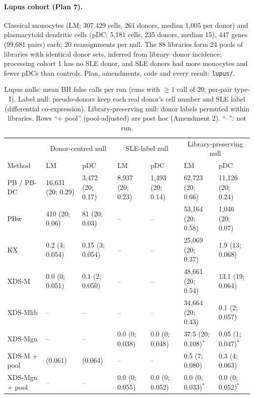 \paragraph{Lupus cohort (Plan 7).} Classical monocytes (LM; 307{,}429 cells, 261 donors, median 1{,}005 per donor) and plasmacytoid dendritic cells (pDC; 5{,}181 cells, 235 donors, median 15), 447 genes (99{,}681 pairs) each; 20 reassignments per null. The 88 libraries form 24 pools of libraries with identical donor sets, inferred from library--donor incidence; processing cohort 1 has no SLE donor, and SLE donors had more monocytes and fewer pDCs than controls. Plan, amendments, code and every result: \texttt{lupus/}.
\begin{table}[h]\centering\footnotesize\setlength{\tabcolsep}{3pt}
\caption{Lupus nulls: mean BH false calls per run (runs with $\ge1$ call of 20; per-pair type-I). Label null: pseudo-donors keep each real donor's cell number and SLE label (differential co-expression). Library-preserving null: donor labels permuted within libraries. Rows ``+ pool'' (pool-adjusted) are post hoc (Amendment 2). ``--'': not run.}\label{tab:lupus}
\begin{tabular}{@{}lllllll@{}}\toprule
 & \multicolumn{2}{c}{Donor-centred null} & \multicolumn{2}{c}{SLE-label null} & \multicolumn{2}{c}{Library-preserving null}\\
Method & LM & pDC & LM & pDC & LM & pDC\\\midrule
PB / PB-DC & 16{,}631 (20; 0.29) & 3{,}472 (20; 0.17) & 8{,}937 (20; 0.23) & 1{,}493 (20; 0.14) & 62{,}723 (20; 0.66) & 11{,}126 (20; 0.24)\\
PBw & 410 (20; 0.06) & 81 (20; 0.03) & -- & -- & 53{,}164 (20; 0.58) & 1{,}046 (20; 0.07)\\
KX & 0.2 (4; 0.054) & 0.15 (3; 0.054) & -- & -- & 25{,}069 (20; 0.37) & 1.9 (13; 0.068)\\
XDS-M & 0.0 (0; 0.051) & 0.1 (2; 0.050) & -- & -- & 48{,}661 (20; 0.54) & 13.1 (19; 0.064)\\
XDS-Mlib & -- & -- & -- & -- & 34{,}664 (20; 0.43) & 0.1 (2; 0.057)\\
XDS-Mgu & -- & -- & 0.0 (0; 0.038) & 0.0 (0; 0.048) & 37.5 (20; 0.108)$^{*}$ & 0.05 (1; 0.047)$^{*}$\\
XDS-M + pool & (0.061) & (0.064) & -- & -- & 0.5 (7; 0.080) & 0.3 (4; 0.063)\\
XDS-Mgu + pool & -- & -- & 0.0 (0; 0.055) & 0.0 (0; 0.052) & 0.0 (0; 0.033)$^{*}$ & 0.0 (0; 0.052)$^{*}$\\\bottomrule
\end{tabular}\par{}
\end{table}

